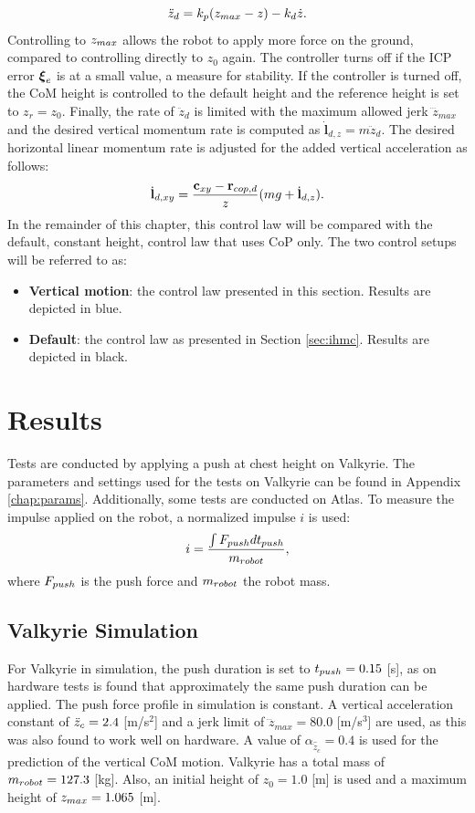 \begin{equation}
	\ddot{z}_d = k_p(z_{max}-z)-k_d\dot{z}.
\end{equation}
Controlling to $z_{max}$ allows the robot to apply more force on the ground, compared to controlling directly to $z_0$ again. The controller turns off if the \ac{ICP} error $\boldsymbol{\xi}_e$ is at a small value, a measure for stability. If the controller is turned off, the \ac{CoM} height is controlled to the default height and the reference height is set to $z_r=z_0$. Finally, the rate of $\ddot{z}_d$ is limited with the maximum allowed jerk $\dddot{z}_{max}$ and the desired vertical momentum rate is computed as $\dot{\mathbf{l}}_{d,z}=m\ddot{z}_d$. The desired horizontal linear momentum rate is adjusted for the added vertical acceleration as follows:
\begin{equation}
    \dot{\mathbf{l}}_{d,xy}= \frac{\mathbf{c}_{xy}-\mathbf{r}_{cop,d}}{z}(mg+\dot{\mathbf{l}}_{d,z}).
\end{equation}
In the remainder of this chapter, this control law will be compared with the default, constant height, control law that uses \ac{CoP} only. The two control setups will be referred to as:
\begin{itemize}
\item \textbf{Vertical motion}: the control law presented in this section. Results are depicted in blue.
\item \textbf{Default}: the control law as presented in Section \ref{sec:ihmc}. Results are depicted in black.
\end{itemize}
\section{Results}
Tests are conducted by applying a push at chest height on Valkyrie. The parameters and settings used for the tests on Valkyrie can be found in Appendix \ref{chap:params}. Additionally, some tests are conducted on Atlas. To measure the impulse applied on the robot, a normalized impulse $i$ is used:
\begin{equation}
	i = \frac{\int F_{push} dt_{push}}{m_{robot}},
\end{equation}
where $F_{push}$ is the push force and $m_{robot}$ the robot mass.
\subsection{Valkyrie Simulation}
For Valkyrie in simulation, the push duration is set to $t_{push}=0.15$ [s], as on hardware tests is found that approximately the same push duration can be applied. The push force profile in simulation is constant. A vertical acceleration constant of $\ddot{z}_{c}=2.4$ [m/s$^2$] and a jerk limit of $\dddot{z}_{max}=80.0$ [m/s$^3$] are used, as this was also found to work well on hardware. A value of $\alpha_{\hat{\ddot{z}}_{c}}=0.4$ is used for the prediction of the vertical \ac{CoM} motion. Valkyrie has a total mass of $m_{robot}=127.3$ [kg]. Also, an initial height of $z_0=1.0$ [m] is used and a maximum height of $z_{max}=1.065$ [m]. 

